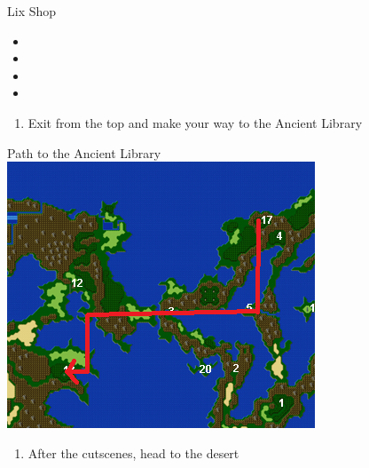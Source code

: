 \begin{paracol}{2}
\begin{shop}{Lix Shop}
    \varwb
    \begin{sell}
        \item {}
        \begin{itemize}
            \item \potion
            \item \silkRobe
            \item \elixir
            \item \thunderRod
        \end{itemize}
    \end{sell}
    \begin{buy}
        \item {} \kunai \space {}
        \item {} \waterScroll \space {}
        \item {} \thunderScroll \space {}
    \end{buy}
    \varwe
\end{shop}

\begin{enumerate}[resume]
    \item Exit from the top and make your way to the Ancient Library
\end{enumerate}

\switchcolumn
\begin{misc}{Path to the Ancient Library}
    \includegraphics[scale=0.6]{../Graphics/Maps/4. To Ancient Library.png}
\end{misc}

\switchcolumn
\begin{enumerate}[resume]
    \item After the cutscenes, head to the desert
\end{enumerate}

\end{paracol}
\newpage